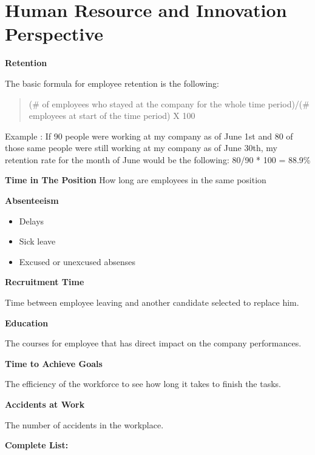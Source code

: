 \documentclass[]{book}
\providecommand{\tightlist}{%
  \setlength{\itemsep}{0pt}\setlength{\parskip}{0pt}}
\begin{document}
\section{Human Resource and Innovation
Perspective}\label{human-resource-and-innovation-perspective}

\textbf{Retention }

The basic formula for employee retention is the following:

\begin{quote}
(\# of employees who stayed at the company for the whole time
period)/(\# employees at start of the time period) X 100
\end{quote}

Example : If 90 people were working at my company as of June 1st and 80
of those same people were still working at my company as of June 30th,
my retention rate for the month of June would be the following: 80/90 *
100 = 88.9\%

\textbf{Time in The Position } How long are employees in the same
position

\textbf{Absenteeism }

\begin{itemize}
\tightlist
\item
  Delays
\item
  Sick leave
\item
  Excused or unexcused absenses
\end{itemize}

\textbf{Recruitment Time }

Time between employee leaving and another candidate selected to replace
him.

\textbf{Education }

The courses for employee that has direct impact on the company
performances.

\textbf{Time to Achieve Goals }

The efficiency of the workforce to see how long it takes to finish the
tasks.

\textbf{Accidents at Work }

The number of accidents in the workplace.

\textbf{Complete List: }
\end{document}
